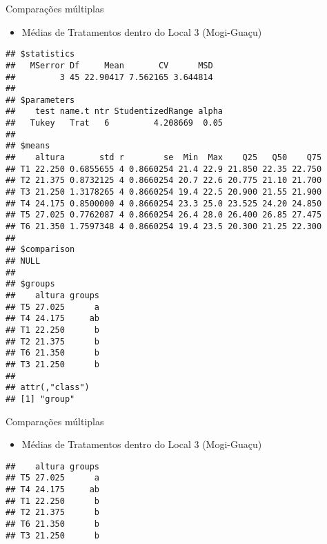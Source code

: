 \documentclass[
  ignorenonframetext,
]{beamer}
\providecommand{\tightlist}{%
  \setlength{\itemsep}{0pt}\setlength{\parskip}{0pt}}
\begin{document}
\begin{frame}[fragile]{Comparações múltiplas}
\protect\hypertarget{comparauxe7uxf5es-muxfaltiplas-7}{}
\begin{itemize}
\tightlist
\item
  Médias de Tratamentos dentro do Local 3 (Mogi-Guaçu)
\end{itemize}

\begin{verbatim}
## $statistics
##   MSerror Df     Mean       CV      MSD
##         3 45 22.90417 7.562165 3.644814
## 
## $parameters
##    test name.t ntr StudentizedRange alpha
##   Tukey   Trat   6         4.208669  0.05
## 
## $means
##    altura       std r        se  Min  Max    Q25   Q50    Q75
## T1 22.250 0.6855655 4 0.8660254 21.4 22.9 21.850 22.35 22.750
## T2 21.375 0.8732125 4 0.8660254 20.7 22.6 20.775 21.10 21.700
## T3 21.250 1.3178265 4 0.8660254 19.4 22.5 20.900 21.55 21.900
## T4 24.175 0.8500000 4 0.8660254 23.3 25.0 23.525 24.20 24.850
## T5 27.025 0.7762087 4 0.8660254 26.4 28.0 26.400 26.85 27.475
## T6 21.350 1.7597348 4 0.8660254 19.4 23.5 20.300 21.25 22.300
## 
## $comparison
## NULL
## 
## $groups
##    altura groups
## T5 27.025      a
## T4 24.175     ab
## T1 22.250      b
## T2 21.375      b
## T6 21.350      b
## T3 21.250      b
## 
## attr(,"class")
## [1] "group"
\end{verbatim}
\end{frame}

\begin{frame}[fragile]{Comparações múltiplas}
\protect\hypertarget{comparauxe7uxf5es-muxfaltiplas-8}{}
\begin{itemize}
\tightlist
\item
  Médias de Tratamentos dentro do Local 3 (Mogi-Guaçu)
\end{itemize}

\begin{verbatim}
##    altura groups
## T5 27.025      a
## T4 24.175     ab
## T1 22.250      b
## T2 21.375      b
## T6 21.350      b
## T3 21.250      b
\end{verbatim}
\end{frame}
\end{document}
